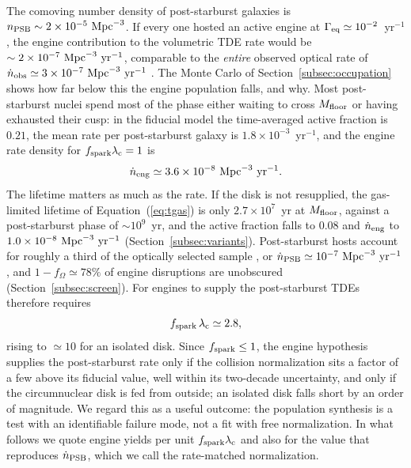 \documentclass[twocolumn,pdftex]{aastex701}
\newcommand{\gameq}{\Gamma_{\rm eq}\xspace}
\newcommand{\fom}{f_{\Omega}\xspace}
\newcommand{\fspark}{f_{\rm spark}\xspace}
\newcommand{\lamc}{\lambda_{\rm c}\xspace}
\begin{document}
The comoving number density of post-starburst galaxies is $n_{\rm PSB} \sim 2 \times 10^{-5}~{\rm Mpc}^{-3}$. If every one hosted an active engine at $\gameq \simeq 10^{-2}$~yr$^{-1}$, the engine contribution to the volumetric TDE rate would be $\sim 2 \times 10^{-7}~{\rm Mpc}^{-3}~{\rm yr}^{-1}$, comparable to the {\it entire} observed optical rate of $\dot{n}_{\rm obs} \simeq 3 \times 10^{-7}~{\rm Mpc}^{-3}~{\rm yr}^{-1}$ \citep{vanVelzen:2018a,Yao:2023a}. The Monte Carlo of Section~\ref{subsec:occupation} shows how far below this the engine population falls, and why. Most post-starburst nuclei spend most of the phase either waiting to cross $M_{\rm floor}$ or having exhausted their cusp: in the fiducial model the time-averaged active fraction is $0.21$, the mean rate per post-starburst galaxy is $1.8 \times 10^{-3}$~yr$^{-1}$, and the engine rate density for $\fspark \lamc = 1$ is
\begin{equation}
\dot{n}_{\rm eng} \simeq 3.6 \times 10^{-8}~{\rm Mpc}^{-3}~{\rm yr}^{-1}.
\label{eq:budget}
\end{equation}
The lifetime matters as much as the rate. If the disk is not resupplied, the gas-limited lifetime of Equation~(\ref{eq:tgas}) is only $2.7 \times 10^{7}$~yr at $M_{\rm floor}$, against a post-starburst phase of $\sim 10^{9}$~yr, and the active fraction falls to $0.08$ and $\dot{n}_{\rm eng}$ to $1.0 \times 10^{-8}~{\rm Mpc}^{-3}~{\rm yr}^{-1}$ (Section~\ref{subsec:variants}). Post-starburst hosts account for roughly a third of the optically selected sample \citep{French:2016a,Hammerstein:2021a}, or $\dot{n}_{\rm PSB} \simeq 10^{-7}~{\rm Mpc}^{-3}~{\rm yr}^{-1}$, and $1 - \fom \simeq 78\%$ of engine disruptions are unobscured (Section~\ref{subsec:screen}). For engines to supply the post-starburst TDEs therefore requires
\begin{equation}
\fspark\, \lamc \simeq 2.8,
\label{eq:fspark}
\end{equation}
rising to $\simeq 10$ for an isolated disk. Since $\fspark \leq 1$, the engine hypothesis supplies the post-starburst rate only if the collision normalization sits a factor of a few above its fiducial value, well within its two-decade uncertainty, and only if the circumnuclear disk is fed from outside; an isolated disk falls short by an order of magnitude. We regard this as a useful outcome: the population synthesis is a test with an identifiable failure mode, not a fit with free normalization. In what follows we quote engine yields per unit $\fspark \lamc$ and also for the value that reproduces $\dot{n}_{\rm PSB}$, which we call the rate-matched normalization.
\end{document}
